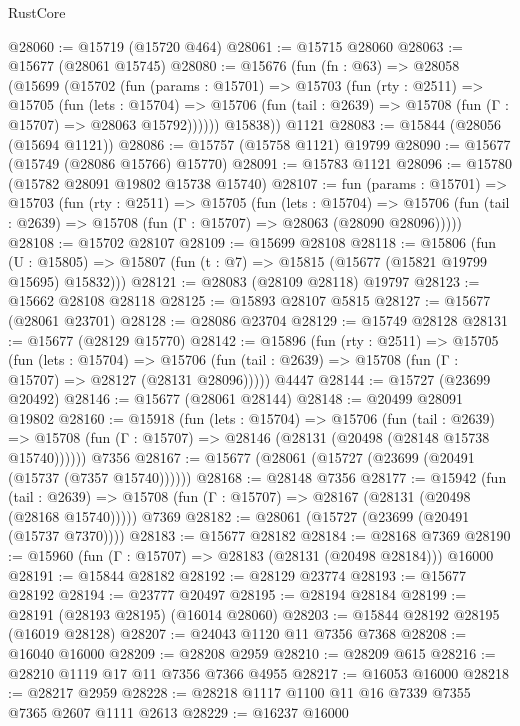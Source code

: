 \begin{lexlean}{RustCore}
\begin{coremodule}
@28060 := @15719 (@15720 @464)
@28061 := @15715 @28060
@28063 := @15677 (@28061 @15745)
@28080 := @15676
    (fun (fn : @63) =>
    @28058
      (@15699
        (@15702
          (fun (params : @15701) =>
          @15703
            (fun (rty : @2511) =>
            @15705
              (fun (lets : @15704) =>
              @15706 (fun (tail : @2639) => @15708 (fun (Γ : @15707) => @28063 @15792))))))
        @15838))
    @1121
@28083 := @15844 (@28056 (@15694 @1121))
@28086 := @15757 (@15758 @1121) @19799
@28090 := @15677 (@15749 (@28086 @15766) @15770)
@28091 := @15783 @1121
@28096 := @15780 (@15782 @28091 @19802 @15738 @15740)
@28107 := fun (params : @15701) =>
  @15703
    (fun (rty : @2511) =>
    @15705
      (fun (lets : @15704) =>
      @15706 (fun (tail : @2639) => @15708 (fun (Γ : @15707) => @28063 (@28090 @28096)))))
@28108 := @15702 @28107
@28109 := @15699 @28108
@28118 := @15806
    (fun (U : @15805) => @15807 (fun (t : @7) => @15815 (@15677 (@15821 @19799 @15695) @15832)))
@28121 := @28083 (@28109 @28118) @19797
@28123 := @15662 @28108 @28118
@28125 := @15893 @28107 @5815
@28127 := @15677 (@28061 @23701)
@28128 := @28086 @23704
@28129 := @15749 @28128
@28131 := @15677 (@28129 @15770)
@28142 := @15896
    (fun (rty : @2511) =>
    @15705
      (fun (lets : @15704) =>
      @15706 (fun (tail : @2639) => @15708 (fun (Γ : @15707) => @28127 (@28131 @28096)))))
    @4447
@28144 := @15727 (@23699 @20492)
@28146 := @15677 (@28061 @28144)
@28148 := @20499 @28091 @19802
@28160 := @15918
    (fun (lets : @15704) =>
    @15706
      (fun (tail : @2639) =>
      @15708 (fun (Γ : @15707) => @28146 (@28131 (@20498 (@28148 @15738 @15740))))))
    @7356
@28167 := @15677 (@28061 (@15727 (@23699 (@20491 (@15737 (@7357 @15740))))))
@28168 := @28148 @7356
@28177 := @15942
    (fun (tail : @2639) => @15708 (fun (Γ : @15707) => @28167 (@28131 (@20498 (@28168 @15740)))))
    @7369
@28182 := @28061 (@15727 (@23699 (@20491 (@15737 @7370))))
@28183 := @15677 @28182
@28184 := @28168 @7369
@28190 := @15960 (fun (Γ : @15707) => @28183 (@28131 (@20498 @28184))) @16000
@28191 := @15844 @28182
@28192 := @28129 @23774
@28193 := @15677 @28192
@28194 := @23777 @20497
@28195 := @28194 @28184
@28199 := @28191 (@28193 @28195) (@16014 @28060)
@28203 := @15844 @28192 @28195 (@16019 @28128)
@28207 := @24043 @1120 @11 @7356 @7368
@28208 := @16040 @16000
@28209 := @28208 @2959
@28210 := @28209 @615
@28216 := @28210 @1119 @17 @11 @7356 @7366 @4955
@28217 := @16053 @16000
@28218 := @28217 @2959
@28228 := @28218 @1117 @1100 @11 @16 @7339 @7355 @7365 @2607 @1111 @2613
@28229 := @16237 @16000

\end{coremodule}
\end{lexlean}
